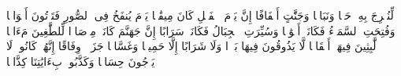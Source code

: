 \stopbuffer%
\startbuffer[\q:78:15]
لِّنُخۡرِجَ بِهِۦ حَبࣰّا وَنَبَاتࣰا%
\stopbuffer%
\startbuffer[\q:78:16]
وَجَنَّٰتٍ أَلۡفَافًا%
\stopbuffer%
\startbuffer[\q:78:17]
إِنَّ یَوۡمَ ٱلۡفَصۡلِ كَانَ مِیقَٰتࣰا%
\stopbuffer%
\startbuffer[\q:78:18]
یَوۡمَ یُنفَخُ فِی ٱلصُّورِ فَتَأۡتُونَ أَفۡوَاجࣰا%
\stopbuffer%
\startbuffer[\q:78:19]
وَفُتِحَتِ ٱلسَّمَاۤءُ فَكَانَتۡ أَبۡوَٰبࣰا%
\stopbuffer%
\startbuffer[\q:78:20]
وَسُیِّرَتِ ٱلۡجِبَالُ فَكَانَتۡ سَرَابًا%
\stopbuffer%
\startbuffer[\q:78:21]
إِنَّ جَهَنَّمَ كَانَتۡ مِرۡصَادࣰا%
\stopbuffer%
\startbuffer[\q:78:22]
لِّلطَّٰغِینَ مَءَابࣰا%
\stopbuffer%
\startbuffer[\q:78:23]
لَّٰبِثِینَ فِیهَاۤ أَحۡقَابࣰا%
\stopbuffer%
\startbuffer[\q:78:24]
لَّا یَذُوقُونَ فِیهَا بَرۡدࣰا وَلَا شَرَابًا%
\stopbuffer%
\startbuffer[\q:78:25]
إِلَّا حَمِیمࣰا وَغَسَّاقࣰا%
\stopbuffer%
\startbuffer[\q:78:26]
جَزَاۤءࣰ وِفَاقًا%
\stopbuffer%
\startbuffer[\q:78:27]
إِنَّهُمۡ كَانُوا۟ لَا یَرۡجُونَ حِسَابࣰا%
\stopbuffer%
\startbuffer[\q:78:28]
وَكَذَّبُوا۟ بِءَایَٰتِنَا كِذَّابࣰا%
\stopbuffer%
